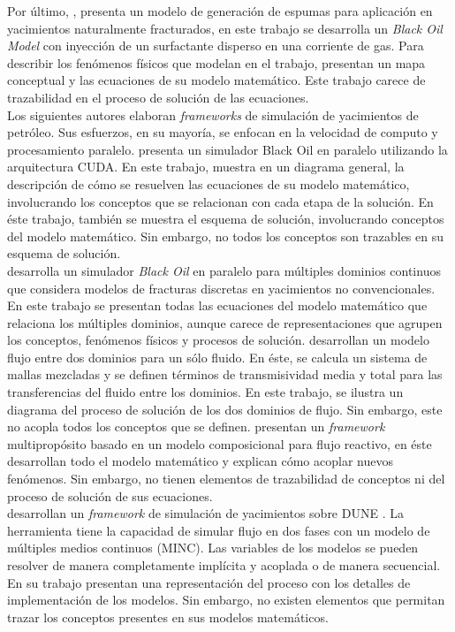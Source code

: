 Por último, \cite{solano2019modeling}, presenta un modelo de generación de espumas para aplicación en yacimientos naturalmente fracturados, en este trabajo se desarrolla un \textit{Black Oil Model} con inyección de un surfactante disperso en una corriente de gas. Para describir los fenómenos físicos que \cite{solano2019modeling} modelan en el trabajo, presentan un mapa conceptual y las ecuaciones de su modelo matemático. Este trabajo carece de trazabilidad en el proceso de solución de las ecuaciones.\\

Los siguientes autores elaboran \textit{frameworks} de simulación de yacimientos de petróleo. Sus esfuerzos, en su mayoría, se enfocan en la velocidad de computo y procesamiento paralelo. \cite{Zaza2016} presenta un simulador Black Oil en paralelo utilizando la arquitectura CUDA. En este trabajo, \cite{Zaza2016} muestra en un diagrama general, la descripción de cómo se resuelven las ecuaciones de su modelo matemático, involucrando los conceptos que se relacionan con cada etapa de la solución. En éste trabajo, también se muestra el esquema de solución, involucrando conceptos del modelo matemático. Sin embargo, no todos los conceptos son trazables en su esquema de solución.\\

\cite{Wang2016, Wang2017} desarrolla un simulador \textit{Black Oil} en paralelo para múltiples dominios continuos que considera modelos de fracturas discretas en yacimientos no convencionales. En este trabajo se presentan todas las ecuaciones del modelo matemático que relaciona los múltiples dominios, aunque carece de representaciones que agrupen los conceptos, fenómenos físicos y procesos de solución. \cite{FANG2017} desarrollan un modelo flujo entre dos dominios para un sólo fluido. En éste, se calcula un sistema de mallas mezcladas y se definen términos de transmisividad media y total para las transferencias del fluido entre los dominios. En este trabajo, se ilustra un diagrama del proceso de solución de los dos dominios de flujo. Sin embargo, este no acopla todos los conceptos que se definen. \cite{Qiao2017} presentan un \textit{framework} multipropósito basado en un modelo composicional para flujo reactivo, en éste desarrollan todo el modelo matemático y explican cómo acoplar nuevos fenómenos. Sin embargo, no tienen elementos de trazabilidad de conceptos ni del proceso de solución de sus ecuaciones.\\

\cite{Flemisch2011} desarrollan un \textit{framework} de simulación de yacimientos sobre DUNE \citep{DUNE24:16}. La herramienta tiene la capacidad de simular flujo en dos fases con un modelo de múltiples medios continuos (MINC). Las variables de los modelos se pueden resolver de manera completamente implícita y acoplada o de manera secuencial. En su trabajo presentan una representación del proceso con los detalles de implementación de los modelos. Sin embargo, no existen elementos que permitan trazar los conceptos presentes en sus modelos matemáticos. \\

